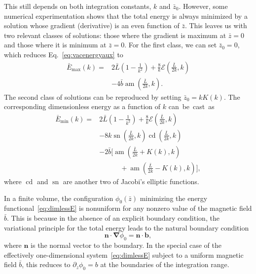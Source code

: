 \documentclass[pdflatex,iicol,sn-mathphys-num]{sn-jnl}
\let\p=\phi
\let\de=\partial
\DeclareMathOperator{\am}{am}%
\DeclareMathOperator{\cd}{cd}%
\DeclareMathOperator{\sn}{sn}%
\newcommand{\vek}[1]{\bm{#1}}%
\newcommand{\grad}{\vek\nabla}%
\newcommand{\bmag}{b}%
\providecommand{\DIFadd}[1]{{\protect\color{blue}\uwave{#1}}} %
\providecommand{\DIFdel}[1]{{\protect\color{red}\sout{#1}}}                      %
\providecommand{\DIFaddbegin}{} %
\providecommand{\DIFaddend}{} %
\providecommand{\DIFdelbegin}{} %
\providecommand{\DIFdelend}{} %
\begin{document}
This still depends on both integration constants, $k$ and $\bar z_0$. However, some numerical experimentation shows that the total energy is always minimized by a solution whose gradient (derivative) is an even function of $\bar z$. This leaves us with two relevant classes of solutions: those where the gradient is maximum at $\bar z=0$ and those where it is minimum at $\bar z=0$. For the first class, we can set $\bar z_0=0$, which reduces Eq.~\eqref{eq:vacenergyaux} to
\begin{equation}
\begin{split}
\bar E_\text{max}(k)={}&2\bar L\left(1-\frac{1}{k^2}\right)+\frac{8}k\mathcal E(\tfrac{\bar L}{2k},k)\\
&-4\bar\bmag\am(\tfrac{\bar L}{2k},k).
\end{split}
\label{eq:vacenergymax}
\end{equation}
The second class of solutions can be reproduced by setting $\bar z_0=kK(k)$. The corresponding dimensionless energy as a function of $k$ can~be~cast~as
\begin{equation}
\begin{split}
\bar E_\text{min}(k)={}&2\bar L\left(1-\frac{1}{k^2}\right)+\frac{8}k\mathcal E(\tfrac{\bar L}{2k},k)\\
&-8k\sn(\tfrac{\bar L}{2k},k)\cd(\tfrac{\bar L}{2k},k)\\
&-2\bar\bmag\bigl[\am(\tfrac{\bar L}{2k}+K(k),k)\\
&\qquad\quad+\am(\tfrac{\bar L}{2k}-K(k),k)\bigr],
\end{split}
\label{eq:vacenergymin}
\end{equation}
where $\cd$ and $\sn$ are another two of Jacobi's elliptic functions.

In a finite volume, the configuration $\p_0(\bar z)$ minimizing the energy functional~\eqref{eq:dimlessE} is nonuniform for any nonzero value of the magnetic field $\bar\bmag$. This is because in the absence of an explicit boundary condition, the variational principle for the total energy leads to the natural boundary condition
\begin{equation}
\vek n\cdot\grad\p_0=\vek n\cdot\vek\bmag,
\label{eq:naturalBC}
\end{equation}
where $\vek n$ is the normal vector to the boundary. In the special case of the effectively one-dimensional system~\eqref{eq:dimlessE} subject to a uniform magnetic field $\bar\bmag$, this reduces to \DIFdelbegin \DIFdel{$\de_ z\p_0=\bmag$ }\DIFdelend \DIFaddbegin \DIFadd{$\de_{\bar z}\p_0=\bar\bmag$ }\DIFaddend at the boundaries of the integration range. 
\end{document}
